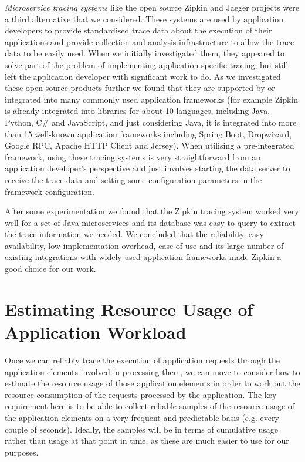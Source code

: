 \emph{Microservice tracing systems} like the open source Zipkin and Jaeger \cite{zipkin2018, jaeger2018} projects were a third alternative that we considered.  These systems are used by application developers to provide standardised trace data about the execution of their applications and provide collection and analysis infrastructure to allow the trace data to be easily used.  When we initially investigated them, they appeared to solve part of the problem of implementing application specific tracing, but still left the application developer with significant work to do.  As we investigated these open source products further we found that they are supported by or integrated into many commonly used application frameworks (for example Zipkin is already integrated into libraries for about 10 languages, including Java, Python, C\# and JavaScript, and just considering Java, it is integrated into more than 15 well-known application frameworks including Spring Boot, Dropwizard, Google RPC, Apache HTTP Client and Jersey).  When utilising a pre-integrated framework, using these tracing systems is very straightforward from an application developer's perspective and just involves starting the data server to receive the trace data and setting some configuration parameters in the framework configuration.

After some experimentation we found that the Zipkin tracing system worked very well for a set of Java microservices and its database was easy to query to extract the trace information we needed.  We concluded that the reliability, easy availability, low implementation overhead, ease of use and its large number of existing integrations with widely used application frameworks made Zipkin a good choice for our work.

\section{Estimating Resource Usage of Application Workload}
\label{section:resusageofappworkload}

Once we can reliably trace the execution of application requests through the application elements involved in processing them, we can move to consider how to estimate the resource usage of those application elements in order to work out the resource consumption of the requests processed by the application.  The key requirement here is to be able to collect reliable samples of the resource usage of the application elements on a very frequent and predictable basis (e.g. every couple of seconds).  Ideally, the samples will be in terms of cumulative usage rather than usage at that point in time, as these are much easier to use for our purposes.

